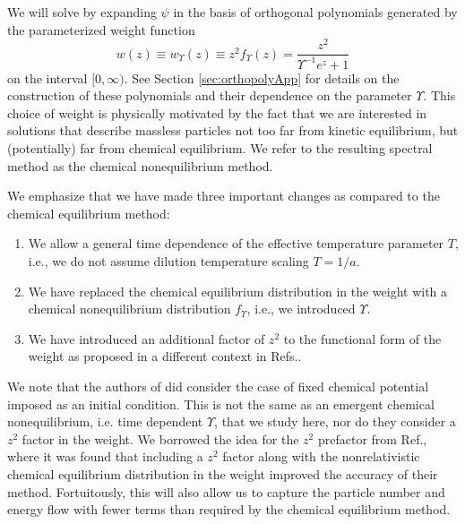 We will solve  by expanding $\psi$ in the basis of orthogonal polynomials generated by the parameterized weight function
\begin{equation}\label{weight}
w(z)\equiv w_\Upsilon(z)\equiv z^2f_\Upsilon (z)=\frac{z^2}{\Upsilon^{-1} e^z+1}
\end{equation}
on the interval $[0,\infty)$. See Section \ref{sec:orthopolyApp} for details on the construction of these polynomials and their dependence on the parameter $\Upsilon$. This choice of weight is physically motivated by the fact that we are interested in solutions that describe massless particles not too far from kinetic equilibrium, but (potentially) far from chemical equilibrium. We refer to the resulting spectral method as the chemical nonequilibrium method.

We emphasize that we have made three important changes as compared to  the chemical equilibrium method:
\begin{enumerate}
\item  We allow a general time dependence of the effective temperature parameter $T$, i.e., we do not assume dilution temperature scaling $T=1/a$.
\item We have replaced the chemical  equilibrium distribution in the weight   with a chemical nonequilibrium distribution  $f_\Upsilon $, i.e., we introduced $\Upsilon$.
\item We have introduced an additional factor of $z^2$ to the functional form of the weight as proposed in a different context in Refs.\cite{Wilkening,Wilkening2}. 
\end{enumerate} 
We note that the authors of \cite{Esposito:2000hi} did consider the case of fixed chemical potential imposed as an initial condition. This is not the same as an emergent chemical nonequilibrium, i.e. time dependent $\Upsilon$, that we study here, nor do they consider a $z^2$ factor in the weight. We borrowed the idea for the $z^2$ prefactor from   Ref.\cite{Wilkening2}, where it was found that including a $z^2$ factor along with the nonrelativistic chemical equilibrium distribution in the weight improved the accuracy of their method. Fortuitously,  this will also allow us to capture the particle number and energy flow with fewer terms than required by the chemical equilibrium method. 

